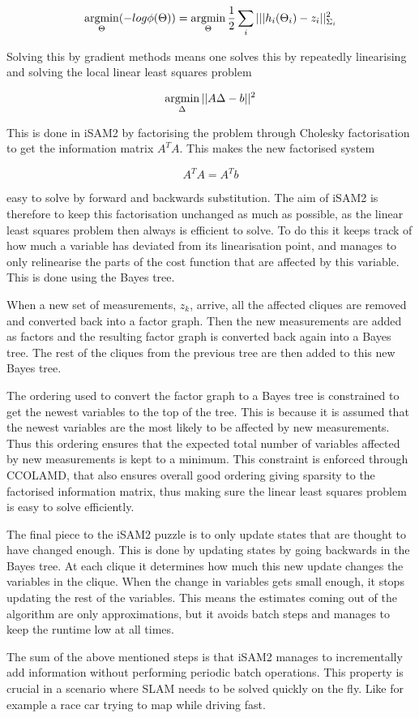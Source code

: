 \begin{equation}
    \operatorname*{argmin}_{\Theta}(-log\phi(\Theta)) = \operatorname*{argmin}_{\Theta}\frac{1}{2}\sum_i|||h_i(\Theta_i) - z_i||_{\Sigma_i}^2
\end{equation}

Solving this by gradient methods means one solves this by repeatedly linearising and solving the local linear least squares problem

\begin{equation}
    \operatorname*{argmin}_{\Delta}||A\Delta - b||^2
\end{equation}

This is done in iSAM2 by factorising the problem through Cholesky factorisation to get the information matrix $A^TA$. This makes the new factorised system

\begin{equation}
    A^TA = A^Tb
\end{equation}

easy to solve by forward and backwards substitution. The aim of iSAM2 is therefore to keep this factorisation unchanged as much as possible, as the linear least squares problem then always is efficient to solve. To do this it keeps track of how much a variable has deviated from its linearisation point, and manages to only relinearise the parts of the cost function that are affected by this variable. This is done using the Bayes tree. 

When a new set of measurements, $z_k$, arrive,  all the affected cliques are removed and converted back into a factor graph. Then the new measurements are added as factors and the resulting factor graph is converted back again into a Bayes tree. The rest of the cliques from the previous tree are then added to this new Bayes tree. 

The ordering used to convert the factor graph to a Bayes tree is constrained to get the newest variables to the top of the tree. This is because it is assumed that the newest variables are the most likely to be affected by new measurements. Thus this ordering ensures that the expected total number of variables affected by new measurements is kept to a minimum. This constraint is enforced through CCOLAMD\cite{CCOLAMD}, that also ensures overall good ordering giving sparsity to the factorised information matrix, thus making sure the linear least squares problem is easy to solve efficiently.

The final piece to the \gls{iSAM2} puzzle is to only update states that are thought to have changed enough. This is done by updating states by going backwards in the Bayes tree. At each clique it determines how much this new update changes the variables in the clique. When the change in variables gets small enough, it stops updating the rest of the variables. This means the estimates coming out of the algorithm are only approximations, but it avoids batch steps and manages to keep the runtime low at all times.

The sum of the above mentioned steps is that \gls{iSAM2} manages to incrementally add information without performing periodic batch operations. This property is crucial in a scenario where SLAM needs to be solved quickly on the fly. Like for example a race car trying to map while driving fast.